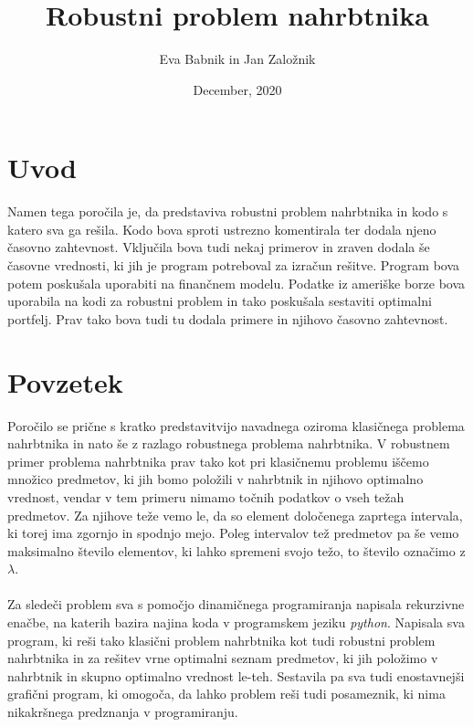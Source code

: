 \documentclass[a4paper,12pt]{article}
\theoremstyle{definition}
\begin{document}
\title{Robustni problem nahrbtnika}
\author{Eva Babnik in Jan Založnik}
\date{December, 2020}
\maketitle


\newpage
\tableofcontents
\listoffigures

\newpage
\section{Uvod}
\medskip
Namen tega poročila je, da predstaviva robustni problem nahrbtnika in kodo s katero sva ga rešila. Kodo bova sproti 
ustrezno komentirala ter dodala njeno časovno zahtevnost. Vključila bova tudi nekaj primerov in zraven dodala še časovne vrednosti, ki jih je program
potreboval za izračun rešitve. Program bova potem poskušala uporabiti na finančnem modelu. Podatke iz ameriške borze bova
uporabila na kodi za robustni problem in tako poskušala sestaviti optimalni portfelj. Prav tako bova tudi tu dodala primere in 
njihovo časovno zahtevnost.

\section{Povzetek}
\medskip
Poročilo se prične s kratko predstavitvijo navadnega oziroma klasičnega problema nahrbtnika in nato še z razlago 
robustnega problema nahrbtnika. V robustnem primer problema nahrbtnika prav tako kot pri klasičnemu problemu iščemo 
množico predmetov, ki jih bomo položili v nahrbtnik in njihovo optimalno vrednost, vendar v tem primeru nimamo točnih podatkov o 
vseh težah predmetov. Za njihove teže vemo le, da so element določenega zaprtega intervala, ki torej ima zgornjo in spodnjo mejo.
Poleg intervalov tež predmetov pa še vemo maksimalno število elementov, ki lahko spremeni svojo težo, to število označimo z $\lambda$.
\paragraph{}
Za sledeči problem sva s pomočjo dinamičnega programiranja napisala rekurzivne enačbe, na katerih bazira
najina koda v programskem jeziku \textit{python}. Napisala sva program, ki reši tako klasični problem nahrbtnika kot 
tudi robustni problem nahrbtnika in za rešitev vrne optimalni seznam predmetov, ki jih položimo v nahrbtnik in skupno 
optimalno vrednost le-teh. Sestavila pa sva tudi enostavnejši grafični program, ki omogoča, da lahko problem reši tudi posameznik, 
ki nima nikakršnega predznanja v programiranju.
\end{document}
